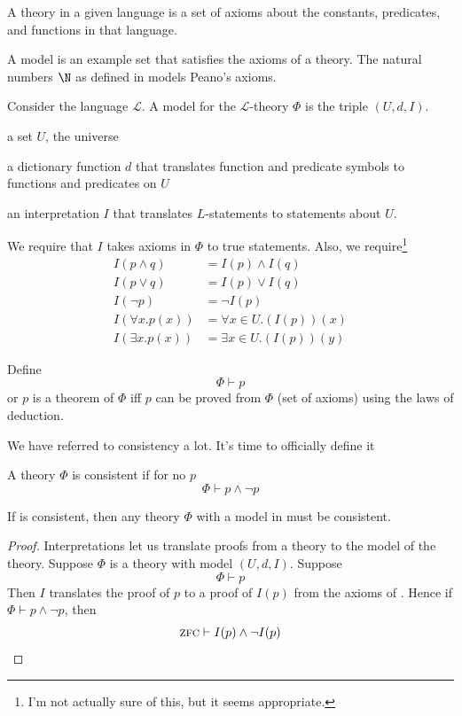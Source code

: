 \message{ !name(truth.tex)}\documentclass{scrbook}
\renewcommand{\implies}{\to}
\begin{document}
\begin{defn}[theory]
  A theory in a given language is a set of axioms about the constants, predicates, and functions in that language.   
\end{defn}
A model is an example set that satisfies the axioms of a theory. The natural numbers $\N$ as defined in \zfc models Peano's axioms.
\begin{defn}[model]
  Consider the language $\mathcal L$. A model for the $\mathcal L$-theory $\Phi$ is the triple $(U,d,I)$. 
  \begin{trivlist}
  \item a set $U$, the universe
  \item a dictionary function $d$ that
    translates function and predicate symbols to functions and
    predicates on $U$
  \item an interpretation $I$ that translates
    $L$-statements to statements about $U$. 
  \end{trivlist}
  We require that $I$ takes axioms in $\Phi$ to true statements. Also, we require\footnote{I'm not actually sure of this, but it seems appropriate.}
  \begin{align*}
  I(p\wedge q)&=I(p)\wedge I(q) \\
  I(p\vee q) &= I(p)\vee I(q) \\
  I(\neg p) &= \neg I(p) \\
  I(\forall x . p(x)) &= \forall x \in U. (I(p))(x) \\
    I(\exists x. p(x))&= \exists x \in U . (I(p))(y)
  \end{align*}
\end{defn}
\begin{defn}
  Define \[\Phi\vdash p\] or $p$ is a theorem of $\Phi$ iff $p$ can be proved from $\Phi$ (set of axioms) using the laws of deduction.
\end{defn}
We have referred to consistency a lot. It's time to officially define it
\begin{defn}[consistency]
  A theory $\Phi$ is consistent if for no $p$
  \[
  \Phi\vdash p\wedge\neg p 
  \]
\end{defn}
\begin{theorem}[model \implies\ consistent]
  If \zfc is consistent, then any theory $\Phi$ with a model in \zfc must be consistent. 
\end{theorem}
\begin{proof}
  Interpretations let us translate proofs from a theory to the model of the theory. 
  Suppose $\Phi$ is a theory with model $(U,d,I)$. Suppose
  \[
  \Phi\vdash p
  \]
  Then $I$ translates the proof of $p$ to a proof of $I(p)$ from the axioms of \zfc. Hence if $\Phi \vdash p\wedge \neg p$, then \[\textsc{zfc} \vdash I(p)\wedge \neg I(p)\]
\end{proof}
\end{document}
